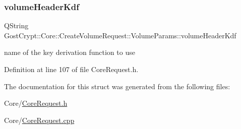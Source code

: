 \subsubsection{\texorpdfstring{volume\+Header\+Kdf}{volumeHeaderKdf}}
{\footnotesize\ttfamily Q\+String Gost\+Crypt\+::\+Core\+::\+Create\+Volume\+Request\+::\+Volume\+Params\+::volume\+Header\+Kdf}

name of the key derivation function to use 

Definition at line 107 of file Core\+Request.\+h.



The documentation for this struct was generated from the following files\+:\begin{DoxyCompactItemize}
\item 
Core/\hyperlink{_core_request_8h}{Core\+Request.\+h}\item 
Core/\hyperlink{_core_request_8cpp}{Core\+Request.\+cpp}\end{DoxyCompactItemize}
